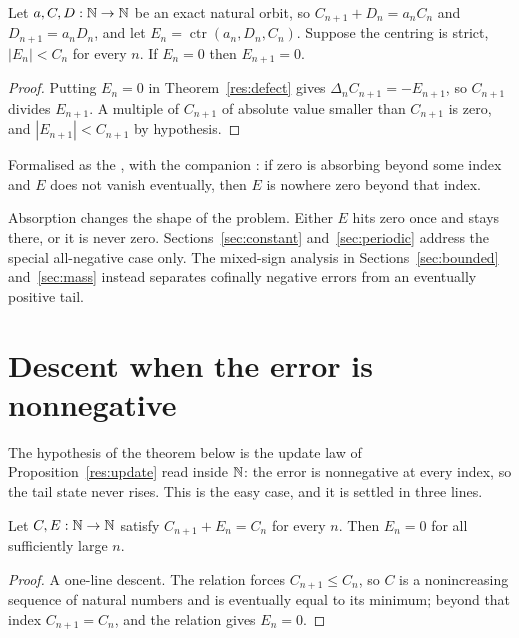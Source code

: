 \documentclass[11pt]{article}
\newcommand{\ctr}{\operatorname{ctr}}
\begin{document}
\begin{theorem}\label{res:absorb}
Let $a,C,D:\mathbb{N}\to\mathbb{N}$ be an exact natural orbit, so
$C_{n+1}+D_n=a_nC_n$ and $D_{n+1}=a_nD_n$, and let
$E_n=\ctr(a_n,D_n,C_n)$.  Suppose the centring is strict, $|E_n|<C_n$ for
every $n$.  If $E_n=0$ then $E_{n+1}=0$.
\end{theorem}

\begin{proof}
Putting $E_n=0$ in Theorem~\ref{res:defect} gives
$\Delta_n C_{n+1}=-E_{n+1}$, so $C_{n+1}$ divides $E_{n+1}$.  A multiple of
$C_{n+1}$ of absolute value smaller than $C_{n+1}$ is zero, and
$|E_{n+1}|<C_{n+1}$ by hypothesis.
\end{proof}

\noindent Formalised as the
, with the companion
: if zero is absorbing beyond some index and $E$ does not vanish
eventually, then $E$ is nowhere zero beyond that index.

Absorption changes the shape of the problem.  Either $E$ hits zero once and
stays there, or it is never zero.  Sections~\ref{sec:constant}
and~\ref{sec:periodic} address the special all-negative case only.  The
mixed-sign analysis
in Sections~\ref{sec:bounded} and~\ref{sec:mass} instead separates cofinally
negative errors from an eventually positive tail.

\section{Descent when the error is nonnegative}\label{sec:descent}

The hypothesis of the theorem below is the update law of
Proposition~\ref{res:update} read inside $\mathbb{N}$: the error is nonnegative at
every index, so the tail state never rises.  This is the easy case, and it is
settled in three lines.

\begin{theorem}[descent]\label{res:descent}
Let $C,E:\mathbb{N}\to\mathbb{N}$ satisfy $C_{n+1}+E_n=C_n$ for every $n$.  Then $E_n=0$ for
all sufficiently large $n$.
\end{theorem}

\begin{proof}
A one-line descent.  The relation forces $C_{n+1}\le C_n$, so $C$ is a nonincreasing sequence of
natural numbers and is eventually equal to its minimum; beyond that index
$C_{n+1}=C_n$, and the relation gives $E_n=0$.
\end{proof}
\end{document}
